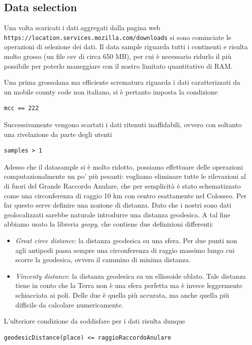 \subsection{Data selection}
Una volta scaricati i dati aggregati dalla pagina web \lstinline{https://location.services.mozilla.com/downloads} si sono cominciate le operazioni di selezione dei dati. Il data sample riguarda tutti i continenti e risulta molto grosso (un file csv di circa 650 MB), per cui è necessario ridurlo il più possibile per poterlo maneggiare con il nostro limitato quantitativo di RAM.

Una prima grossolana ma efficiente scrematura riguarda i dati caratterizzati da un mobile county code non italiano, si è pertanto imposta la condizione
\begin{lstlisting}
mcc == 222
\end{lstlisting}
Successivamente vengono scartati i dati ritenuti inaffidabili, ovvero con soltanto una rivelazione da parte degli utenti
\begin{lstlisting}
samples > 1
\end{lstlisting}

Adesso che il datasample si è molto ridotto, possiamo effettuare delle operazioni computazionalmente un po' più pesanti: vogliamo eliminare tutte le rilevazioni al di fuori del Grande Raccordo Anulare, che per semplicità è stato schematizzato come una circonferenza di raggio 10 km con centro esattamente nel Colosseo. Per far questo serve definire una nozione di distanza. Dato che i nostri sono dati geolocalizzati sarebbe naturale introdurre una distanza geodesica. A tal fine abbiamo usato la libreria \emph{geopy}, che contiene due definizioni differenti:

\begin{itemize}
 \item \emph{Great circe distance}: la distanza geodesica su una sfera. Per due punti non agli antipodi passa sempre una circonferenza di raggio massimo lungo cui scorre la geodesica, ovvero il cammino di minima distanza.
 \item \emph{Vincenty distance}: la distanza geodesica su un ellissoide oblato. Tale distanza tiene in conto che la Terra non è una sfera perfetta ma è invece leggermente schiacciata ai poli. Delle due è quella più accurata, ma anche quella più difficile da calcolare numericamente.
\end{itemize}
L'ulteriore condizione da soddisfare per i dati risulta dunque
\begin{lstlisting}
geodesicDistance(place) <= raggioRaccordoAnulare
\end{lstlisting}

